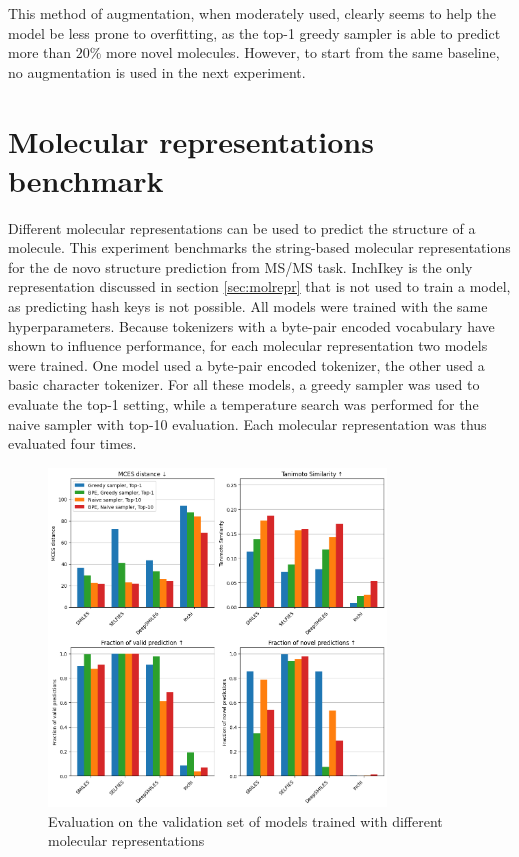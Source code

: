 This method of augmentation, when moderately used, clearly seems to help the model be less prone to overfitting, as the top-1 greedy sampler is able to predict more than $20\%$ more novel molecules. 
However, to start from the same baseline, no augmentation is used in the next experiment.

\section{Molecular representations benchmark}

Different molecular representations can be used to predict the structure of a molecule.
This experiment benchmarks the string-based molecular representations for the de novo structure prediction from \ac{MS/MS} task.
InchIkey is the only representation discussed in section \ref{sec:molrepr} that is not used to train a model, as predicting hash keys is not possible.
All models were trained with the same hyperparameters.
Because tokenizers with a byte-pair encoded vocabulary have shown to influence performance, for each molecular representation two models were trained.
One model used a byte-pair encoded tokenizer, the other used a basic character tokenizer.
For all these models, a greedy sampler was used to evaluate the top-1 setting, while a temperature search was performed for the naive sampler with top-10 evaluation.
Each molecular representation was thus evaluated four times.

\begin{figure}[h]
    \centering
    \includegraphics[width=0.8\textwidth]{figures/results/representations_with_tanimoto.png}
    \caption{Evaluation on the validation set of models trained with different molecular representations}
    \label{fig:representations}
\end{figure}

